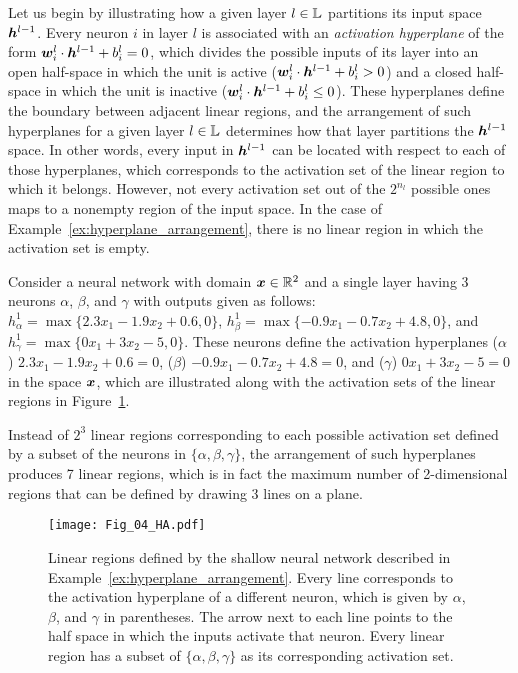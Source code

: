 
Let us begin by illustrating how a given layer $l \in {\mathbb{L}}$ partitions its input space ${\bm{h}}^{l-1}$. Every neuron $i$ in layer $l$ is associated with an \emph{activation hyperplane} of the form ${\bm{w}}_i^l \cdot {\bm{h}}^{l-1} + b_i^l = 0$, which divides the  possible inputs of its layer into an open half-space in which the unit is active (${\bm{w}}_i^l \cdot {\bm{h}}^{l-1} + b_i^l > 0$) and a closed half-space in which the unit is inactive (${\bm{w}}_i^l \cdot {\bm{h}}^{l-1} + b_i^l \leq 0$). These hyperplanes define the boundary between adjacent linear regions, and the arrangement of such hyperplanes for a given layer $l \in {\mathbb{L}}$ determines how that layer partitions the ${\bm{h}}^{l-1}$ space. 
In other words, every input in ${\bm{h}}^{l-1}$ can be located with respect to each of those hyperplanes, which corresponds to the activation set of the linear region to which it belongs. 
However, not every activation set out of the $2^{n_l}$ possible ones maps to a nonempty region of the input space. In the case of Example~\ref{ex:hyperplane_arrangement}, there is no linear region in which the activation set is empty.

\begin{example}\label{ex:hyperplane_arrangement}
Consider a neural network with domain ${\bm{x}} \in \mathbb{R}^2$ and a single layer having 3 neurons $\alpha$, $\beta$, and $\gamma$ with outputs given as follows: 
$h^1_{\alpha} = \max\{ 2.3 x_1 - 1.9 x_2 +0.6, 0\}$, $h^1_{\beta} = \max\{ -0.9 x_1 - 0.7 x_2 +4.8, 0\}$, and $h^1_{\gamma} = \max\{ 0 x_1 + 3 x_2 -5, 0\}$. 
These neurons define the activation hyperplanes ($\alpha$) $2.3 x_1 - 1.9 x_2 +0.6 = 0$, ($\beta$) $-0.9 x_1 - 0.7 x_2 +4.8 = 0$, and ($\gamma$) $0 x_1 + 3 x_2 -5 = 0$ in the space ${\bm{x}}$, 
which are illustrated along with the activation sets of the linear regions in Figure~\ref{fig:hyperplane_arrangement}.

Instead of $2^3$ linear regions corresponding to each possible activation set defined by a subset of the neurons in $\{\alpha, \beta, \gamma\}$, the arrangement of such hyperplanes produces 7 linear regions, 
which is in fact the maximum number of 2-dimensional regions that can be defined by drawing 3 lines on a plane. 
\end{example}

\begin{figure}
    \centering
    \texttt{[image: Fig\_04\_HA.pdf]}
    \caption{Linear regions defined by the shallow neural network described in Example~\ref{ex:hyperplane_arrangement}. 
    Every line corresponds to the activation hyperplane of a different neuron, which is given by $\alpha$, $\beta$, and $\gamma$ in parentheses. 
    The arrow next to each line points to the half space in which the inputs activate that neuron.
    Every linear region has a subset of $\{\alpha,\beta,\gamma\}$ as its corresponding activation set.}
    \label{fig:hyperplane_arrangement}
\end{figure}

